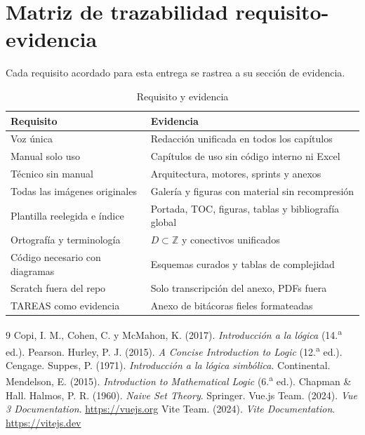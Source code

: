 \documentclass[11pt,a4paper,openany]{book}
\begin{document}
\chapter{Matriz de trazabilidad requisito-evidencia}
\label{ch:traz-req}
Cada requisito acordado para esta entrega se rastrea a su secci\'on de evidencia.
\begin{table}[H]
\centering
\caption{Requisito y evidencia}
\begin{tabular}{ll}
\toprule
Requisito & Evidencia \\
\midrule
Voz \'unica & Redacci\'on unificada en todos los cap\'itulos \\
Manual solo uso & Cap\'itulos de uso sin c\'odigo interno ni Excel \\
T\'ecnico sin manual & Arquitectura, motores, sprints y anexos \\
Todas las im\'agenes originales & Galer\'ia y figuras con material sin recompresi\'on \\
Plantilla reelegida e \'indice & Portada, TOC, figuras, tablas y bibliograf\'ia global \\
Ortograf\'ia y terminolog\'ia & $D \subset \mathbb{Z}$ y conectivos unificados \\
C\'odigo necesario con diagramas & Esquemas curados y tablas de complejidad \\
Scratch fuera del repo & Solo transcripci\'on del anexo, PDFs fuera \\
TAREAS como evidencia & Anexo de bit\'acoras fieles formateadas \\
\bottomrule
\end{tabular}
\end{table}

\begin{thebibliography}{9}
 Copi, I. M., Cohen, C. y McMahon, K. (2017). \textit{Introducci\'on a la l\'ogica} (14.\textsuperscript{a} ed.). Pearson.
 Hurley, P. J. (2015). \textit{A Concise Introduction to Logic} (12.\textsuperscript{a} ed.). Cengage.
 Suppes, P. (1971). \textit{Introducci\'on a la l\'ogica simb\'olica}. Continental.
 Mendelson, E. (2015). \textit{Introduction to Mathematical Logic} (6.\textsuperscript{a} ed.). Chapman \& Hall.
 Halmos, P. R. (1960). \textit{Naive Set Theory}. Springer.
 Vue.js Team. (2024). \textit{Vue 3 Documentation}. \url{https://vuejs.org}
 Vite Team. (2024). \textit{Vite Documentation}. \url{https://vitejs.dev}
\end{thebibliography}
\backmatter
\end{document}
